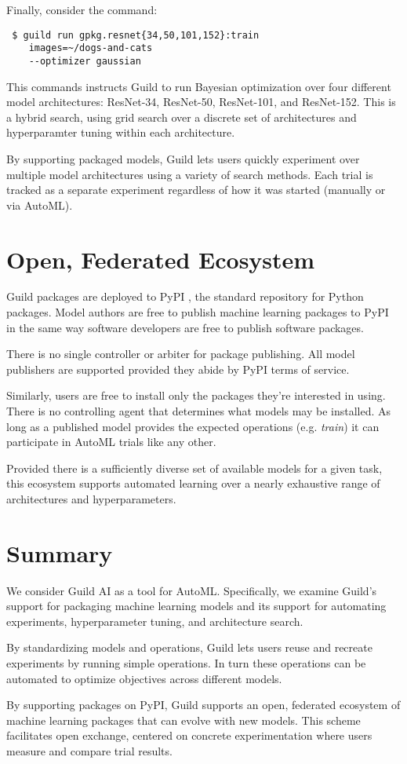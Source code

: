\documentclass{article}
\begin{document}
Finally, consider the command:

{\footnotesize
\begin{verbatim}
 $ guild run gpkg.resnet{34,50,101,152}:train
    images=~/dogs-and-cats
    --optimizer gaussian
\end{verbatim}}

This commands instructs Guild to run Bayesian optimization over four
different model architectures: ResNet-34, ResNet-50, ResNet-101, and
ResNet-152. This is a hybrid search, using grid search over a discrete
set of architectures and hyperparamter tuning within each
architecture.

By supporting packaged models, Guild lets users quickly experiment
over multiple model architectures using a variety of search
methods. Each trial is tracked as a separate experiment regardless of
how it was started (manually or via AutoML).

\section{Open, Federated Ecosystem}

Guild packages are deployed to PyPI \cite{PyPI}, the standard
repository for Python packages. Model authors are free to publish
machine learning packages to PyPI in the same way software developers
are free to publish software packages.

There is no single controller or arbiter for package publishing. All
model publishers are supported provided they abide by PyPI terms of
service.

Similarly, users are free to install only the packages they're
interested in using. There is no controlling agent that determines
what models may be installed. As long as a published model provides
the expected operations (e.g. \emph{train}) it can participate in
AutoML trials like any other.

Provided there is a sufficiently diverse set of available models for a
given task, this ecosystem supports automated learning over a nearly
exhaustive range of architectures and hyperparameters.

\section{Summary}

We consider Guild AI as a tool for AutoML. Specifically, we examine
Guild's support for packaging machine learning models and its support
for automating experiments, hyperparameter tuning, and architecture
search.

By standardizing models and operations, Guild lets users reuse and
recreate experiments by running simple operations. In turn these
operations can be automated to optimize objectives across different
models.

By supporting packages on PyPI, Guild supports an open, federated
ecosystem of machine learning packages that can evolve with new
models. This scheme facilitates open exchange, centered on concrete
experimentation where users measure and compare trial results.



\end{document}

